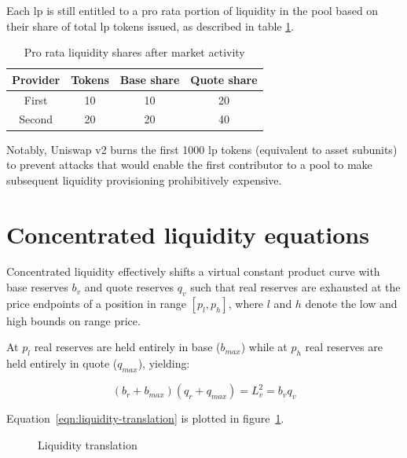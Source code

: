 \documentclass[table, twocolumn]{article}
\begin{document}
Each \gls{lp} is still entitled to a pro rata portion of liquidity in the pool based on their share
of total \gls{lp} tokens issued, as described in table \ref{tab:lp-pro-rata-shares}.

\begin{table}[!htb]
  \centering
  \begin{tabular}{|c|c|c|c|}
    \hline \rowcolor{blue}
    Provider & Tokens & Base share & Quote share \\ \hline
    First    & 10     & 10         & 20          \\ \hline
    Second   & 20     & 20         & 40          \\ \hline
  \end{tabular}
  \caption{Pro rata liquidity shares after market activity}
  \label{tab:lp-pro-rata-shares}
\end{table}

Notably, Uniswap v2 burns the first 1000 \gls{lp} tokens (equivalent to asset subunits) to prevent
attacks that would enable the first contributor to a pool to make subsequent liquidity provisioning
prohibitively expensive.

\section{Concentrated liquidity equations}

Concentrated liquidity effectively shifts a virtual constant product curve with base reserves $b_v$
and quote reserves $q_v$ such that real reserves are exhausted at the price endpoints of a position
in range $[p_l, p_h]$, where $l$ and $h$ denote the low and high bounds on range price.

At $p_l$ real reserves are held entirely in base ($b_{max}$) while at $p_h$ real reserves are held
entirely in quote ($q_{max}$), yielding:

\begin{equation} \label{eqn:liquidity-translation}
  (b_r + b_{max})(q_r + q_{max}) = L_v^2 = b_v q_v
\end{equation}

Equation~\ref{eqn:liquidity-translation} is plotted in figure~\ref{fig:liquidity-translation}.

\begin{figure}[!htb]
  \centering
  
  \caption{Liquidity translation}
  \label{fig:liquidity-translation}
\end{figure}
\end{document}
